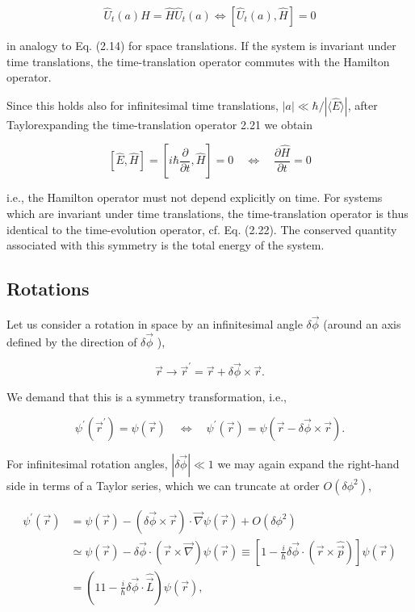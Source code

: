 \documentclass[10pt, letterpaper]{article}
\begin{document}
$$
\hat{U}_{t}(a) \hat{H}=\hat{H} \hat{U}_{t}(a) \Longleftrightarrow\left[\hat{U}_{t}(a), \hat{H}\right]=0
$$

in analogy to Eq. (2.14) for space translations. If the system is invariant under time translations, the time-translation operator commutes with the Hamilton operator.

Since this holds also for infinitesimal time translations, $|a| \ll \hbar /|\langle\hat{E}\rangle|$, after Taylorexpanding the time-translation operator 2.21 we obtain

$$
[\hat{E}, \hat{H}]=\left[i \hbar \frac{\partial}{\partial t}, \hat{H}\right]=0 \quad \Longleftrightarrow \quad \frac{\partial \hat{H}}{\partial t}=0
$$

i.e., the Hamilton operator must not depend explicitly on time. For systems which are invariant under time translations, the time-translation operator is thus identical to the time-evolution operator, cf. Eq. (2.22). The conserved quantity associated with this symmetry is the total energy of the system.



\subsection{Rotations}
Let us consider a rotation in space by an infinitesimal angle $\delta \vec{\phi}$ (around an axis defined by the direction of $\delta \vec{\phi}$ ),

$$
\vec{r} \longrightarrow \vec{r}^{\prime}=\vec{r}+\delta \vec{\phi} \times \vec{r} .
$$

We demand that this is a symmetry transformation, i.e.,

$$
\psi^{\prime}\left(\vec{r}^{\prime}\right)=\psi(\vec{r}) \quad \Longleftrightarrow \quad \psi^{\prime}(\vec{r})=\psi(\vec{r}-\delta \vec{\phi} \times \vec{r}) .
$$

For infinitesimal rotation angles, $|\delta \vec{\phi}| \ll 1$ we may again expand the right-hand side in terms of a Taylor series, which we can truncate at order $O\left(\delta \phi^{2}\right)$,

$$
\begin{aligned}
\psi^{\prime}(\vec{r}) & =\psi(\vec{r})-(\delta \vec{\phi} \times \vec{r}) \cdot \vec{\nabla} \psi(\vec{r})+O\left(\delta \phi^{2}\right) \\
& \simeq \psi(\vec{r})-\delta \vec{\phi} \cdot(\vec{r} \times \vec{\nabla}) \psi(\vec{r}) \equiv\left[1-\frac{i}{\hbar} \delta \vec{\phi} \cdot(\vec{r} \times \hat{\vec{p}})\right] \psi(\vec{r}) \\
& =\left(11-\frac{i}{\hbar} \delta \vec{\phi} \cdot \hat{\vec{L}}\right) \psi(\vec{r}),
\end{aligned}
$$
\end{document}
